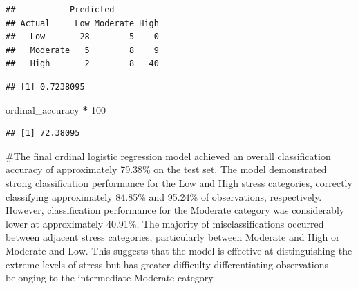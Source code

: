\documentclass[
]{article}
\newenvironment{Shaded}{\begin{snugshade}}{\end{snugshade}}
\newcommand{\AttributeTok}[1]{\textcolor[rgb]{0.13,0.29,0.53}{#1}}
\newcommand{\DecValTok}[1]{\textcolor[rgb]{0.00,0.00,0.81}{#1}}
\newcommand{\FunctionTok}[1]{\textcolor[rgb]{0.13,0.29,0.53}{\textbf{#1}}}
\newcommand{\NormalTok}[1]{#1}
\newcommand{\OtherTok}[1]{\textcolor[rgb]{0.56,0.35,0.01}{#1}}
\newcommand{\SpecialCharTok}[1]{\textcolor[rgb]{0.81,0.36,0.00}{\textbf{#1}}}
\begin{document}
\begin{Shaded}
\end{Shaded}

\begin{verbatim}
##           Predicted
## Actual     Low Moderate High
##   Low       28        5    0
##   Moderate   5        8    9
##   High       2        8   40
\end{verbatim}

\begin{Shaded}
\end{Shaded}

\begin{verbatim}
## [1] 0.7238095
\end{verbatim}

\begin{Shaded}
\begin{Highlighting}[]
\NormalTok{ordinal\_accuracy }\SpecialCharTok{*} \DecValTok{100}
\end{Highlighting}
\end{Shaded}

\begin{verbatim}
## [1] 72.38095
\end{verbatim}

\#The final ordinal logistic regression model achieved an overall
classification accuracy of approximately 79.38\% on the test set. The
model demonstrated strong classification performance for the Low and
High stress categories, correctly classifying approximately 84.85\% and
95.24\% of observations, respectively. However, classification
performance for the Moderate category was considerably lower at
approximately 40.91\%. The majority of misclassifications occurred
between adjacent stress categories, particularly between Moderate and
High or Moderate and Low. This suggests that the model is effective at
distinguishing the extreme levels of stress but has greater difficulty
differentiating observations belonging to the intermediate Moderate
category.
\end{document}
